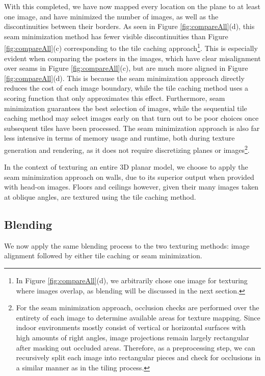 \documentclass[10pt,twocolumn,letterpaper]{article}
\begin{document}
With this completed, we have now mapped every location on the plane to
at least one image, and have minimized the number of images, as well
as the discontinuities between their borders. As seen in Figure
\ref{fig:compareAll}(d), this seam minimization method has fewer
visible discontinuities than Figure \ref{fig:compareAll}(c)
corresponding to the tile caching approach\footnote{In Figure
  \ref{fig:compareAll}(d), we arbitrarily chose one image for
  texturing where images overlap, as blending will be discussed in the
  next section.}. This is especially evident when comparing the
posters in the images, which have clear misalignment over seams in
Figure \ref{fig:compareAll}(c), but are much more aligned in Figure
\ref{fig:compareAll}(d). This is because the seam minimization
approach directly reduces the cost of each image boundary, while the
tile caching method uses a scoring function that only approximates
this effect. Furthermore, seam minimization guarantees the best
selection of images, while the sequential tile caching method may
select images early on that turn out to be poor choices once
subsequent tiles have been processed. The seam minimization approach
is also far less intensive in terms of memory usage and runtime, both
during texture generation and rendering, as it does not require
discretizing planes or images\footnote {For the seam minimization
  approach, occlusion checks are performed over the entirety of each
  image to determine available areas for texture mapping. Since indoor
  environments mostly consist of vertical or horizontal surfaces with
  high amounts of right angles, image projections remain largely
  rectangular after masking out occluded areas. Therefore, as a
  preprocessing step, we can recursively split each image into
  rectangular pieces and check for occlusions in a similar manner as
  in the tiling process.  }.

In the context of texturing an entire 3D planar model, we choose to
apply the seam minimization approach on walls, due to its superior
output when provided with head-on images. Floors and ceilings however,
given their many images taken at oblique angles, are textured using
the tile caching method.



\subsection{Blending}
\label{sec:blending}
We now apply the same blending process to the two texturing methods:
image alignment followed by either tile caching or seam minimization.
\end{document}
